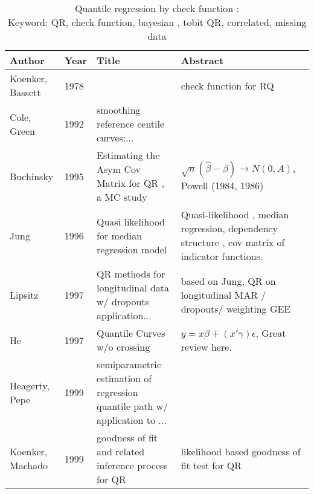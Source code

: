 \documentclass{article}
\begin{document}
\begin{table}[htbp]
\caption[]{\label{tab:qr1} Quantile regression by check function :                                                              \\
Keyword: QR, check function, bayesian , tobit QR, correlated, missing data}
\vspace{4mm}
\begin{tabular}[tb]{m{4cm}|m{1cm}|m{5cm}|m{5cm}}
\hline
Author                    & Year & Title                                        & Abstract                                      \\
\hline
Koenker, Bassett          & 1978 &                                              & check function for RQ                         \\
\hline 
Cole, Green               & 1992 & smoothing reference centile curves:...       &                                               \\
\hline
Buchinsky                 & 1995 & Estimating the Asym Cov Matrix for QR , a MC study
                          & $\sqrt{n} (\hat{\beta}-\beta) \to N(0, A) $, Powell (1984,
1986)                                                                                                                           \\
\hline
Jung                      & 1996 & Quasi likelihood for median regression model & 
Quasi-likelihood , median regression, dependency structure , cov
matrix of indicator functions.                                                                                                  \\
\hline
Lipsitz                   & 1997 & QR methods for longitudinal data w/ dropouts
application...            & based on Jung, QR on longitudinal MAR / dropouts/
weighting GEE                                                                                                                   \\
\hline
He                        & 1997 & Quantile Curves w/o crossing                 & $y = x\beta +
(x'\gamma)\epsilon$, Great review here.                                                                                         \\
\hline 
Heagerty, Pepe & 1999 & semiparametric estimation of regression
quantile path w/ application to ... & \\
\hline
Koenker, Machado  & 1999 & goodness of fit and related inference
process for QR & likelihood based goodness of fit test for QR \\

\end{tabular}
\end{table}
\end{document}
